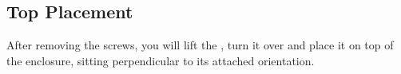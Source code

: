 
\subsection{Top Placement}

After removing the screws, you will lift the , turn it over and place
it on top of the enclosure, sitting perpendicular to its attached orientation.

